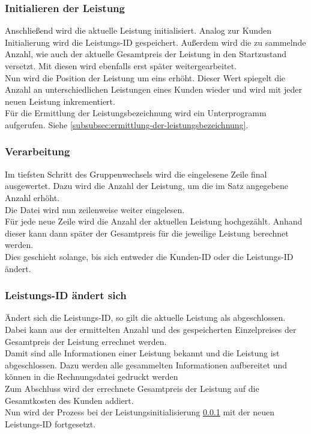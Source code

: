 \subsubsection{Initialieren der Leistung}\label{subsubsec:initialisieren-der-leistung}
Anschließend wird die aktuelle Leistung initialisiert. Analog zur Kunden Initialierung wird die Leistungs-ID gespeichert. Außerdem wird die zu sammelnde Anzahl, wie auch der aktuelle Gesamtpreis der Leistung in den Startzustand versetzt. Mit diesen wird ebenfalls erst später weitergearbeitet.\\
Nun wird die Position der Leistung um eins erhöht. Dieser Wert spiegelt die Anzahl an unterschiedlichen Leistungen eines Kunden wieder und wird mit jeder neuen Leistung inkrementiert.\\
Für die Ermittlung der Leistungsbezeichnung wird ein Unterprogramm aufgerufen. Siehe \ref{subsubsec:ermittlung-der-leistungsbezeichnung}.\\

\subsubsection{Verarbeitung}
Im tiefsten Schritt des Gruppenwechsels wird die eingelesene Zeile final ausgewertet. Dazu wird die Anzahl der Leistung, um die im Satz angegebene Anzahl erhöht.\\
Die Datei wird nun zeilenweise weiter eingelesen.\\
Für jede neue Zeile wird die Anzahl der aktuellen Leistung hochgezählt. Anhand dieser kann dann später der Gesamtpreis für die jeweilige Leistung berechnet werden.\\
Dies geschieht solange, bis sich entweder die Kunden-ID oder die Leistungs-ID ändert.

\subsubsection{Leistungs-ID ändert sich}\label{subsubsec:leistungs-id-aendert-sich}
Ändert sich die Leistungs-ID, so gilt die aktuelle Leistung als abgeschlossen. Dabei kann aus der ermittelten Anzahl und des gespeicherten Einzelpreises der Gesamtpreis der Leistung errechnet werden.\\
Damit sind alle Informationen einer Leistung bekannt und die Leistung ist abgeschlossen. Dazu werden alle gesammelten Informationen aufbereitet und können in die Rechnungsdatei gedruckt werden\\
Zum Abschluss wird der errechnete Gesamtpreis der Leistung auf die Gesamtkosten des Kunden addiert.\\
Nun wird der Prozess bei der Leistungsinitialisierung \ref{subsubsec:initialisieren-der-leistung} mit der neuen Leistungs-ID fortgesetzt.\\


